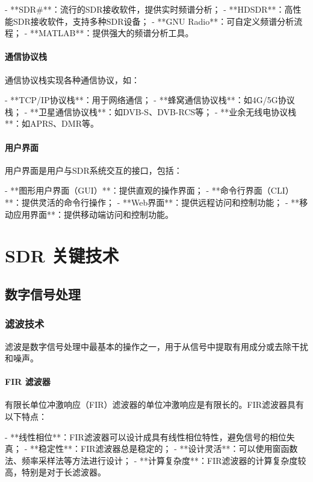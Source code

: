 ﻿\documentclass[UTF8]{ctexbook}
\begin{document}
- **SDR\#**：流行的SDR接收软件，提供实时频谱分析；
- **HDSDR**：高性能SDR接收软件，支持多种SDR设备；
- **GNU Radio**：可自定义频谱分析流程；
- **MATLAB**：提供强大的频谱分析工具。

\subsubsection{通信协议栈}

通信协议栈实现各种通信协议，如：

- **TCP/IP协议栈**：用于网络通信；
- **蜂窝通信协议栈**：如4G/5G协议栈；
- **卫星通信协议栈**：如DVB-S、DVB-RCS等；
- **业余无线电协议栈**：如APRS、DMR等。

\subsubsection{用户界面}

用户界面是用户与SDR系统交互的接口，包括：

- **图形用户界面（GUI）**：提供直观的操作界面；
- **命令行界面（CLI）**：提供灵活的命令行操作；
- **Web界面**：提供远程访问和控制功能；
- **移动应用界面**：提供移动端访问和控制功能。

\chapter{SDR 关键技术}

\section{数字信号处理}

\subsection{滤波技术}

滤波是数字信号处理中最基本的操作之一，用于从信号中提取有用成分或去除干扰和噪声。

\subsubsection{FIR 滤波器}

有限长单位冲激响应（FIR）滤波器的单位冲激响应是有限长的。FIR滤波器具有以下特点：

- **线性相位**：FIR滤波器可以设计成具有线性相位特性，避免信号的相位失真；
- **稳定性**：FIR滤波器总是稳定的；
- **设计灵活**：可以使用窗函数法、频率采样法等方法进行设计；
- **计算复杂度**：FIR滤波器的计算复杂度较高，特别是对于长滤波器。
\end{document}
